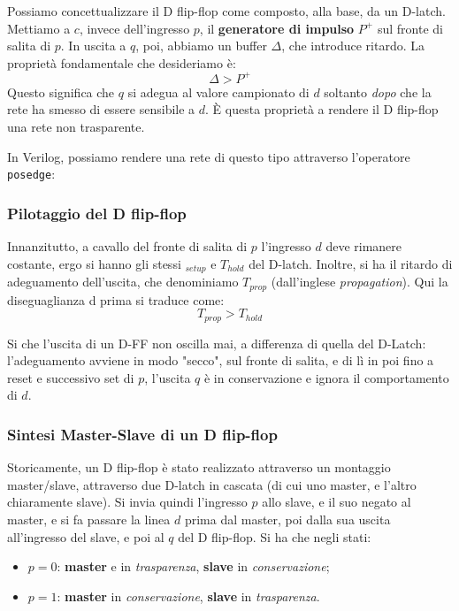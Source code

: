 \documentclass[a4paper,11pt]{article}
\begin{document}
Possiamo concettualizzare il D flip-flop come composto, alla base, da un D-latch.
Mettiamo a $c$, invece dell'ingresso $p$, il \textbf{generatore di impulso} $P^+$ sul fronte di salita di $p$.
In uscita a $q$, poi, abbiamo un buffer $\Delta$, che introduce ritardo.
La proprietà fondamentale che desideriamo è:
$$
\Delta > P^+ 
$$
Questo significa che $q$ si adegua al valore campionato di $d$ soltanto \textit{dopo} che la rete ha smesso di essere sensibile a $d$.
È questa proprietà a rendere il D flip-flop una rete non trasparente.

In Verilog, possiamo rendere una rete di questo tipo attraverso l'operatore \lstinline|posedge|:



\subsubsection{Pilotaggio del D flip-flop}
Innanzitutto, a cavallo del fronte di salita di $p$ l'ingresso $d$ deve rimanere costante, ergo si hanno gli stessi $_{setup}$ e $T_{hold}$ del D-latch.
Inoltre, si ha il ritardo di adeguamento dell'uscita, che denominiamo $T_{prop}$ (dall'inglese \textit{propagation}).
Qui la diseguaglianza d prima si traduce come:
$$
T_{prop} > T_{hold}
$$

\par\medskip 

Si che l'uscita di un D-FF non oscilla mai, a differenza di quella del D-Latch: l'adeguamento avviene in modo "secco", sul fronte di salita, e di lì in poi fino a reset e successivo set di $p$, l'uscita $q$ è in conservazione e ignora il comportamento di $d$.

\subsubsection{Sintesi Master-Slave di un D flip-flop}
Storicamente, un D flip-flop è stato realizzato attraverso un montaggio master/slave, attraverso due D-latch in cascata (di cui uno master, e l'altro chiaramente slave).
Si invia quindi l'ingresso $p$ allo slave, e il suo negato al master, e si fa passare la linea $d$ prima dal master, poi dalla sua uscita all'ingresso del slave, e poi al $q$ del D flip-flop.
Si ha che negli stati:
\begin{itemize}
	\item $p=0$: \textbf{master} e in \textit{trasparenza}, \textbf{slave} in \textit{conservazione};
	\item $p=1$: \textbf{master} in \textit{conservazione}, \textbf{slave} in \textit{trasparenza}.
\end{itemize}
\end{document}
